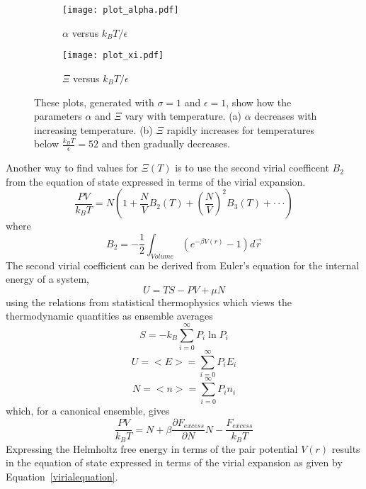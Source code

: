 \documentclass[12pt]{article}
\begin{document}
 \begin{figure}[h!]
    \centering
    \begin{subfigure}[b]{0.4\linewidth}
      \texttt{[image: plot\_alpha.pdf]}
      \caption{$\alpha$ versus $k_BT/\epsilon$}
    \end{subfigure} 
    \begin{subfigure}[b]{0.4\linewidth}
      \texttt{[image: plot\_xi.pdf]}
      \caption{$\Xi$ versus $k_BT/\epsilon$}
    \end{subfigure} 
    \caption{These plots, generated with $\sigma=1$ and $\epsilon=1$, show how the parameters $\alpha$ and $\Xi$ vary with temperature. (a) $\alpha$ decreases with increasing temperature. (b) $\Xi$ rapidly increases for temperatures below $\frac{k_BT}{\epsilon}=52$ and then gradually decreases.}
    \label{fig:alphaXivsT}
    \end{figure} 



Another way to find values for $\Xi(T)$ is to use the second virial coefficent $B_{2}$ from the equation of state expressed in terms of the virial expansion. 
\begin{equation}\label{virialequation}
    \frac{PV}{k_BT}=N\left(1+\frac{N}{V}B_2(T)+\left(\frac{N}{V}\right)^2B_3(T)+ \cdot\cdot\cdot\right) 
\end{equation}
where 
\begin{equation}
	B_{2}=-\frac{1}{2}\int_{Volume}\left(e^{-\beta{V}(r)}-1\right)d\vec{r} 
\end{equation}
The second virial coefficient can be derived from Euler's equation for the internal energy of a system, 
\begin{equation}U=TS-PV+\mu{N}\end{equation}
using the relations from statistical thermophysics which views the thermodynamic quantities as ensemble averages
\begin{equation}S=-k_B\sum_{i=0}^\infty{P_i\ln{P_i}}\end{equation}
\begin{equation}U=<E>=\sum_{i=0}^\infty{P_iE_i}\end{equation}
\begin{equation}N=<n>=\sum_{i=0}^\infty{P_in_i}\end{equation}
which, for a canonical ensemble, gives
\begin{equation}\frac{PV}{k_BT}=N + \beta\frac{\partial{F}_{excess}}{\partial{N}}{N} - \frac{F_{excess}}{k_BT}\end{equation}
Expressing the Helmholtz free energy in terms of the pair potential $V(r)$ results in the equation of state expressed in terms of the virial expansion as given by Equation~\ref{virialequation}.
\end{document}
